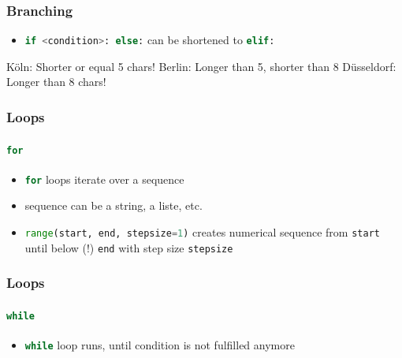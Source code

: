 \documentclass[english]{beamer}
\newcommand{\ta}[1]{\textattachfile[color=1 0 0]{#1}{Code}}
\begin{document}
\begin{frame}[containsverbatim]
\frametitle{Branching}

\begin{itemize}
\item \lstinline[language={Python}]{if <condition>: else:} can be shortened to \lstinline[language={Python}]{elif:} 
\end{itemize}



\begin{ausgabe}
Köln: Shorter or equal 5 chars!
Berlin: Longer than 5, shorter than 8
Düsseldorf: Longer than 8 chars!
\end{ausgabe}


\end{frame}


\begin{frame}[containsverbatim]
\frametitle{Loops}
\framesubtitle{\lstinline[language={Python}]{for}}

\begin{itemize}
\item \lstinline[language={Python}]{for} loops iterate over a sequence
\item sequence can be a string, a liste, etc. 
\item \lstinline[language={Python}]{range(start, end, stepsize=1)} creates numerical sequence from \texttt{start} until below (!) \texttt{end} with step size \texttt{stepsize}
\end{itemize}



\end{frame}


\begin{frame}[containsverbatim]
\frametitle{Loops}
\framesubtitle{\lstinline[language={Python}]{while}}

\begin{itemize}
\item \lstinline[language={Python}]{while} loop runs, until condition is not fulfilled anymore
\end{itemize}



\end{frame}
\end{document}

